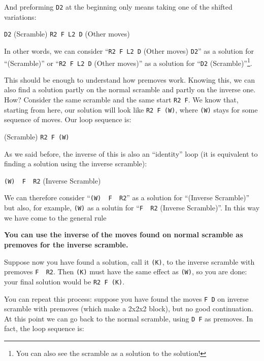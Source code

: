 \documentclass[11pt,a4paper]{book}
\newcommand{\p}{\textquotesingle}
\newcommand{\m}{\texttt}
\newcommand{\ps}{\p\,\,}
\begin{document}
And preforming \m{D2} at the beginning only means taking one of the shifted variations:

\begin{center}
\m{D2} (Scramble) \m{R2 F L2 D\p} (Other moves)
\end{center}

In other words, we can consider ``\m{R2 F L2 D\p} (Other moves) \m{D2}'' as a solution for ``(Scramble)'' or ``\m{R2 F L2 D\p} (Other moves)'' as a solution for ``\m{D2} (Scramble)''\footnote{You can also see the scramble as a solution to the solution!}.

This should be enough to understand how premoves work. Knowing this, we can also find a solution partly on the normal scramble and partly on the inverse one. How? Consider the same scramble and the same start \m{R2 F}. We know that, starting from here, our solution will look like \m{R2 F (W)}, where \m{(W)} stays for some sequence of moves. Our loop sequence is:

\begin{center}
(Scramble) \m{R2 F (W)}
\end{center}

As we said before, the inverse of this is also an ``identity'' loop (it is equivalent to finding a solution using the inverse scramble):

\begin{center}
\m{(W)\ps F\ps R2} (Inverse Scramble)
\end{center}

We can therefore consider ``\m{(W)\ps F\ps R2}'' as a solution for ``(Inverse Scramble)'' but also, for example, \m{(W)\p} as a solutin for ``\m{F\ps R2} (Inverse Scramble)''. In this way we have come to the general rule

\begin{framed}
\textbf{You can use the inverse of the moves found on normal scramble as premoves for the inverse scramble.}
\end{framed}

Suppose now you have found a solution, call it \m{(K)}, to the inverse scramble with premoves \m{F\ps R2}. Then \m{(K)} must have the same effect as \m{(W)\p}, so you are done: your final solution would be \m{R2 F (K)\p}.

You can repeat this process: suppose you have found the moves \m{F D\p} on inverse scramble with premoves (which make a 2x2x2 block), but no good continuation. At this point we can go back to the normal scramble, using \m{D F\p} as premoves. In fact, the loop sequence is:
\end{document}
